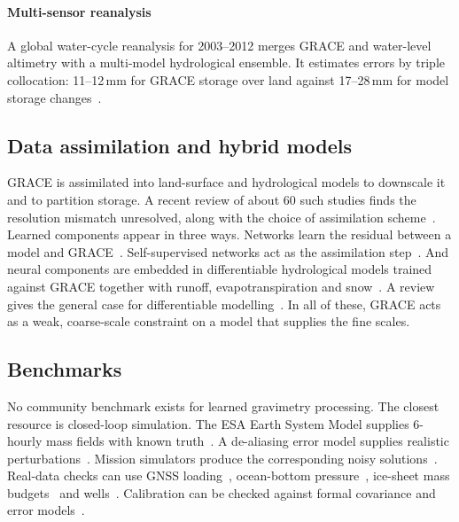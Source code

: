 \paragraph{Multi-sensor reanalysis} A global water-cycle reanalysis for 2003--2012 merges GRACE and water-level altimetry with a multi-model hydrological ensemble. It estimates errors by triple collocation: 11--12\,mm for GRACE storage over land against 17--28\,mm for model storage changes~\cite{vandijk2014reanalysis}.

\subsection{Data assimilation and hybrid models}

GRACE is assimilated into land-surface and hydrological models to downscale it and to partition storage. A recent review of about 60 such studies finds the resolution mismatch unresolved, along with the choice of assimilation scheme~\cite{springer2026review}. Learned components appear in three ways. Networks learn the residual between a model and GRACE~\cite{sun2019combining}. Self-supervised networks act as the assimilation step~\cite{gou2024global,gou2025obp}. And neural components are embedded in differentiable hydrological models trained against GRACE together with runoff, evapotranspiration and snow~\cite{kraft2022h2m,baghirov2025h2mv}. A review gives the general case for differentiable modelling~\cite{shen2023differentiable}. In all of these, GRACE acts as a weak, coarse-scale constraint on a model that supplies the fine scales.

\subsection{Benchmarks}

No community benchmark exists for learned gravimetry processing. The closest resource is closed-loop simulation. The ESA Earth System Model supplies 6-hourly mass fields with known truth~\cite{dobslaw2015esa_esm}. A de-aliasing error model supplies realistic perturbations~\cite{dobslaw2016dealiasing_errors}. Mission simulators produce the corresponding noisy solutions~\cite{pfeffer2026nggm,goracci2026nggm}. Real-data checks can use GNSS loading~\cite{carlson2022gnss_grace}, ocean-bottom pressure~\cite{chambers2012obp}, ice-sheet mass budgets~\cite{velicogna2020continuity} and wells~\cite{pascal2022evaluating,suryawanshi2026efficacy}. Calibration can be checked against formal covariance and error models~\cite{wahr2006accuracy,boergens2020covariance,loomis2019regularization}.
